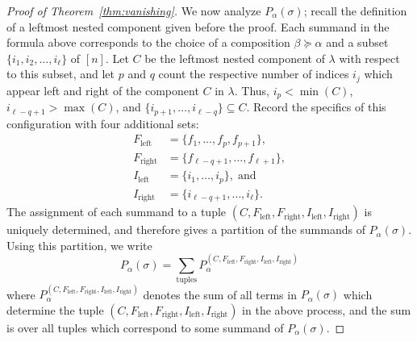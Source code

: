\documentclass[12pt]{amsart}
\theoremstyle{definition}
\theoremstyle{remark}
\numberwithin{equation}{section}
\begin{document}
\begin{proof}[Proof of Theorem~\ref{thm:vanishing}]
We now analyze $P_{\alpha}(\sigma)$; recall the definition of a leftmost nested component given before the proof.  
Each summand in the formula above corresponds to the choice of a composition $\beta \succeq \alpha$ and a subset $\{i_{1}, i_{2}, \ldots, i_{\ell}\}$ of $[n]$.  
Let $C$ be the leftmost nested component of $\lambda$ with respect to this subset, and let $p$ and $q$ count the respective number of indices $i_{j}$ which appear left and right of the component $C$ in $\lambda$.  
Thus, $i_{p} < \min(C)$, $i_{\ell - q+1} > \max(C)$, and $\{i_{p+1}, \ldots, i_{\ell - q}\} \subseteq C$.  
Record the specifics of this configuration with four additional sets:
\begin{align*}
F_{\text{left}} &= \{f_{1}, \ldots, f_{p}, f_{p+1}\}, \\
F_{\text{right}} &= \{f_{\ell - q+1}, \ldots, f_{\ell+1}\}, \\
I_{\text{left}} &= \{i_{1}, \ldots, i_{p}\},\;\text{and} \\ 
I_{\text{right}} &= \{i_{\ell - q+1}, \ldots, i_{\ell}\}.
\end{align*}  
The assignment of each summand to a tuple $(C, F_{\text{left}}, F_{\text{right}}, I_{\text{left}}, I_{\text{right}})$ is uniquely determined, and therefore gives a partition of the summands of $P_{\alpha}(\sigma)$.  Using this partition, we write
\[
P_{\alpha}(\sigma) = \sum_{\text{tuples}} P_{\alpha}^{(C, F_{\text{left}}, F_{\text{right}}, I_{\text{left}}, I_{\text{right}})}
\]
where $P_{\alpha}^{(C, F_{\text{left}}, F_{\text{right}}, I_{\text{left}}, I_{\text{right}})}$ denotes the sum of all terms in $P_{\alpha}(\sigma)$ which determine the tuple $(C, F_{\text{left}}, F_{\text{right}}, I_{\text{left}}, I_{\text{right}})$ in the above process, and the sum is over all tuples which correspond to some summand of $P_{\alpha}(\sigma)$.  


\end{proof}
\end{document}
